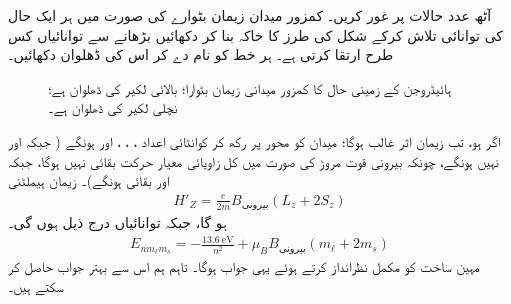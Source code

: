  
 
آٹھ عدد  حالات  پر غور کریں۔ کمزور میدان زیمان بٹوارے کی صورت میں ہر ایک حال کی توانائی تلاش کرکے شکل  کی طرز کا خاکہ بنا کر دکھائیں  بڑھانے سے توانائیاں کس طرح ارتقا کرتی ہے۔ ہر خط کو نام دے کر اس کی ڈھلوان دکھائیں۔
\begin{figure}
\centering
{}
\caption{ہائیڈروجن کے زمینی حال کا کمزور میدانی زیمان بٹوارا؛ بالائی لکیر  کی ڈھلوان  ہے؛ نچلی لکیر  کی ڈھلوان  ہے۔}
\label{شکل_غیر_تابع_اضطراب_زیمان_بٹوارا_کمزور_میدان}
\end{figure}




اگر  ہو، تب زیمان اثر غالب ہوگا؛  میدان  کو  محور پر رکھ کر  کوانٹائی اعداد ، ، ، اور  ہونگے ( جبکہ  اور  نہیں ہونگے، چونکہ بیرونی قوت مروڑ کی صورت میں کل زاویائی معیار حرکت بقائی نہیں ہوگا، جبکہ  اور  بقائی ہونگے)۔ زیمان ہیملٹنی 
\begin{align*}
H'_Z = \frac{e}{2m} B_{\text{بیرونی}} (L_z + 2S_z)
\end{align*}
ہو گا، جبکہ  توانائیاں درج ذیل ہوں گی۔ 
\begin{align}\label{مساوات_غیر_مضطرب_طاقتور_زیمان_حصہ}
E_{nm_{\ell}m_s} = - \frac{\SI{13.6}{\electronvolt}}{n^2} + \mu_B B_{\text{بیرونی}} (m_{\ell} + 2m_s)
\end{align}
مہین ساخت کو مکمل نظرانداز کرتے ہوئے یہی جواب ہوگا۔ تاہم ہم اس سے بہتر جواب حاصل کر سکتے ہیں۔

